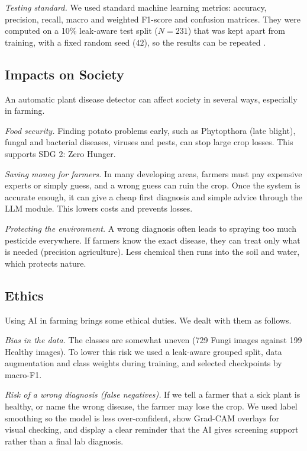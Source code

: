 \textit{Testing standard.} We used standard machine learning metrics: accuracy, precision, recall, macro and weighted F1-score and confusion matrices. They were computed on a 10\% leak-aware test split ($N = 231$) that was kept apart from training, with a fixed random seed ($42$), so the results can be repeated \cite{grandini2020metrics}.

\subsection{Impacts on Society}
An automatic plant disease detector can affect society in several ways, especially in farming.

\textit{Food security.} Finding potato problems early, such as Phytopthora (late blight), fungal and bacterial diseases, viruses and pests, can stop large crop losses. This supports SDG 2: Zero Hunger.

\textit{Saving money for farmers.} In many developing areas, farmers must pay expensive experts or simply guess, and a wrong guess can ruin the crop. Once the system is accurate enough, it can give a cheap first diagnosis and simple advice through the LLM module. This lowers costs and prevents losses.

\textit{Protecting the environment.} A wrong diagnosis often leads to spraying too much pesticide everywhere. If farmers know the exact disease, they can treat only what is needed (precision agriculture). Less chemical then runs into the soil and water, which protects nature.

\subsection{Ethics}
Using AI in farming brings some ethical duties. We dealt with them as follows.

\textit{Bias in the data.} The classes are somewhat uneven (729 Fungi images against 199 Healthy images). To lower this risk we used a leak-aware grouped split, data augmentation and class weights during training, and selected checkpoints by macro-F1.

\textit{Risk of a wrong diagnosis (false negatives).} If we tell a farmer that a sick plant is healthy, or name the wrong disease, the farmer may lose the crop. We used label smoothing so the model is less over-confident, show Grad-CAM overlays for visual checking, and display a clear reminder that the AI gives screening support rather than a final lab diagnosis.

